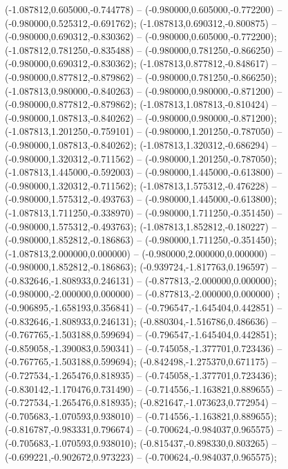  (-1.087812,0.605000,-0.744778) -- (-0.980000,0.605000,-0.772200) -- (-0.980000,0.525312,-0.691762);
 (-1.087813,0.690312,-0.800875) -- (-0.980000,0.690312,-0.830362) -- (-0.980000,0.605000,-0.772200);
 (-1.087812,0.781250,-0.835488) -- (-0.980000,0.781250,-0.866250) -- (-0.980000,0.690312,-0.830362);
 (-1.087813,0.877812,-0.848617) -- (-0.980000,0.877812,-0.879862) -- (-0.980000,0.781250,-0.866250);
 (-1.087813,0.980000,-0.840263) -- (-0.980000,0.980000,-0.871200) -- (-0.980000,0.877812,-0.879862);
 (-1.087813,1.087813,-0.810424) -- (-0.980000,1.087813,-0.840262) -- (-0.980000,0.980000,-0.871200);
 (-1.087813,1.201250,-0.759101) -- (-0.980000,1.201250,-0.787050) -- (-0.980000,1.087813,-0.840262);
 (-1.087813,1.320312,-0.686294) -- (-0.980000,1.320312,-0.711562) -- (-0.980000,1.201250,-0.787050);
 (-1.087813,1.445000,-0.592003) -- (-0.980000,1.445000,-0.613800) -- (-0.980000,1.320312,-0.711562);
 (-1.087813,1.575312,-0.476228) -- (-0.980000,1.575312,-0.493763) -- (-0.980000,1.445000,-0.613800);
 (-1.087813,1.711250,-0.338970) -- (-0.980000,1.711250,-0.351450) -- (-0.980000,1.575312,-0.493763);
 (-1.087813,1.852812,-0.180227) -- (-0.980000,1.852812,-0.186863) -- (-0.980000,1.711250,-0.351450);
 (-1.087813,2.000000,0.000000) -- (-0.980000,2.000000,0.000000) -- (-0.980000,1.852812,-0.186863);
 (-0.939724,-1.817763,0.196597) -- (-0.832646,-1.808933,0.246131) -- (-0.877813,-2.000000,0.000000);
 (-0.980000,-2.000000,0.000000) -- (-0.877813,-2.000000,0.000000) ;
 (-0.906895,-1.658193,0.356841) -- (-0.796547,-1.645404,0.442851) -- (-0.832646,-1.808933,0.246131);
 (-0.880304,-1.516786,0.486636) -- (-0.767765,-1.503188,0.599694) -- (-0.796547,-1.645404,0.442851);
 (-0.859058,-1.390083,0.590341) -- (-0.745058,-1.377701,0.723436) -- (-0.767765,-1.503188,0.599694);
 (-0.842498,-1.275370,0.671175) -- (-0.727534,-1.265476,0.818935) -- (-0.745058,-1.377701,0.723436);
 (-0.830142,-1.170476,0.731490) -- (-0.714556,-1.163821,0.889655) -- (-0.727534,-1.265476,0.818935);
 (-0.821647,-1.073623,0.772954) -- (-0.705683,-1.070593,0.938010) -- (-0.714556,-1.163821,0.889655);
 (-0.816787,-0.983331,0.796674) -- (-0.700624,-0.984037,0.965575) -- (-0.705683,-1.070593,0.938010);
 (-0.815437,-0.898330,0.803265) -- (-0.699221,-0.902672,0.973223) -- (-0.700624,-0.984037,0.965575);
